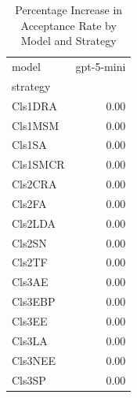 \begin{table}
\caption{Percentage Increase in Acceptance Rate by Model and Strategy}
\label{tab:pct_increase}
\begin{tabular}{lr}
\toprule
model & gpt-5-mini \\
strategy &  \\
\midrule
Cls1DRA & 0.00 \\
Cls1MSM & 0.00 \\
Cls1SA & 0.00 \\
Cls1SMCR & 0.00 \\
Cls2CRA & 0.00 \\
Cls2FA & 0.00 \\
Cls2LDA & 0.00 \\
Cls2SN & 0.00 \\
Cls2TF & 0.00 \\
Cls3AE & 0.00 \\
Cls3EBP & 0.00 \\
Cls3EE & 0.00 \\
Cls3LA & 0.00 \\
Cls3NEE & 0.00 \\
Cls3SP & 0.00 \\
\bottomrule
\end{tabular}
\end{table}
